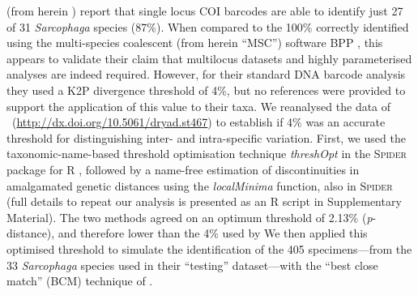\documentclass[12pt]{article}
\begin{document}
\citet{Dowton2014} (from herein \citeauthor{Dowton2014}) report that single locus COI barcodes are able to identify just 27 of 31 \emph{Sarcophaga} species (87\%). When compared to the 100\% correctly identified using the multi-species coalescent (from herein ``MSC'') software BPP \citep{Yang2010}, this appears to validate their claim that multilocus datasets and highly parameterised analyses are indeed required. However, for their standard DNA barcode analysis they used a K2P divergence threshold of 4\%, but no references were provided to support the application of this value to their taxa. We reanalysed the data of \citeauthor{Dowton2014}\ (\url{http://dx.doi.org/10.5061/dryad.st467}) to establish if 4\% was an accurate threshold for distinguishing inter- and intra-specific variation. First, we used the taxonomic-name-based threshold optimisation technique \textsl{threshOpt} in the \textsc{Spider} package for R \citep{Brown2012}, followed by a name-free estimation of discontinuities in amalgamated genetic distances using the \textsl{localMinima} function, also in \textsc{Spider} (full details to repeat our analysis is presented as an R script in Supplementary Material). The two methods agreed on an optimum threshold of 2.13\% (\emph{p}-distance), and therefore lower than the 4\% used by \citeauthor{Dowton2014} We then applied this optimised threshold to simulate the identification of the 405 specimens---from the 33 \emph{Sarcophaga} species used in their ``testing'' dataset---with the ``best close match'' (BCM) technique of \citet{Meier2006}.
\end{document}
